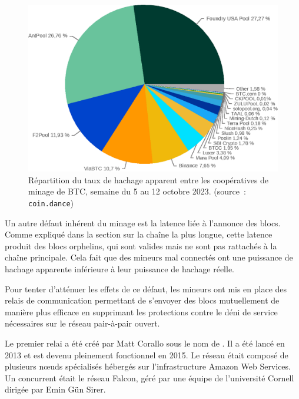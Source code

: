 \begin{figure}[h]
  \centering
  \includegraphics[scale=0.75]{img/hashrate-distribution-coin-dance-week-20231012.eps}
  \caption{Répartition du taux de hachage apparent entre les coopératives de minage de BTC, semaine du 5 au 12 octobre 2023. (source~: \texttt{coin.dance})}
  \label{fig:hashrate-distribution}
\end{figure}


Un autre défaut inhérent du minage est la latence liée à l'annonce des blocs. Comme expliqué dans la section sur la chaîne la plus longue, cette latence produit des blocs orphelins, qui sont valides mais ne sont pas rattachés à la chaîne principale. Cela fait que des mineurs mal connectés ont une puissance de hachage apparente inférieure à leur puissance de hachage réelle.

Pour tenter d'atténuer les effets de ce défaut, les mineurs ont mis en place des relais de communication permettant de s'envoyer des blocs mutuellement de manière plus efficace en supprimant les protections contre le déni de service nécessaires sur le réseau pair-à-pair ouvert.

Le premier relai a été créé par Matt Corallo sous le nom de . Il a été lancé en 2013 et est devenu pleinement fonctionnel en 2015. Le réseau était composé de plusieurs nœuds spécialisés hébergés sur l'infrastructure Amazon Web Services. Un concurrent était le réseau Falcon, géré par une équipe de l'université Cornell dirigée par Emin Gün Sirer.

